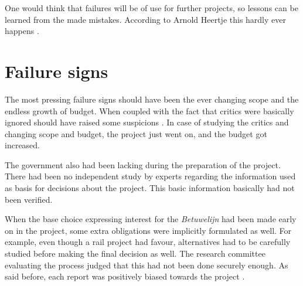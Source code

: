 \documentclass[]{uva-bachelor-thesis}
\def \CurrChapter {}
\def \CurrSection {}
\renewcommand{\chaptermark}[1]{\def \CurrChapter {#1} \def \CurrSection {}}
\begin{document}
One would think that failures will be of use for further projects, so lessons can be learned from the made mistakes.
According to Arnold Heertje this hardly ever happens \cite{eenvandaag}.

\section{Failure signs}
The most pressing failure signs should have been the ever changing scope and the endless growth of budget. 
When coupled with the fact that critics were basically ignored should have raised some suspicions \cite{beleidsinformatie-betuweroute, commissie-duivesteijn}.
In case of studying the critics and changing scope and budget, the project just went on, and the budget got increased. 

The government also had been lacking during the preparation of the project. 
There had been no independent study by experts regarding the information used as basis for decisions about the project. 
This basic information basically had not been verified\cite{beleidsinformatie-betuweroute, commissie-duivesteijn}.

When the base choice expressing interest for the \emph{Betuwelijn} had been made early on in the project, some extra obligations were implicitly formulated as well. 
For example, even though a rail project had favour, alternatives had to be carefully studied before making the final decision as well. 
The research committee evaluating the process judged that this had not been done securely enough. 
As said before, each report was positively biased towards the project \cite{beleidsinformatie-betuweroute}.



\chaptermark{Bibliography}
\end{document}
